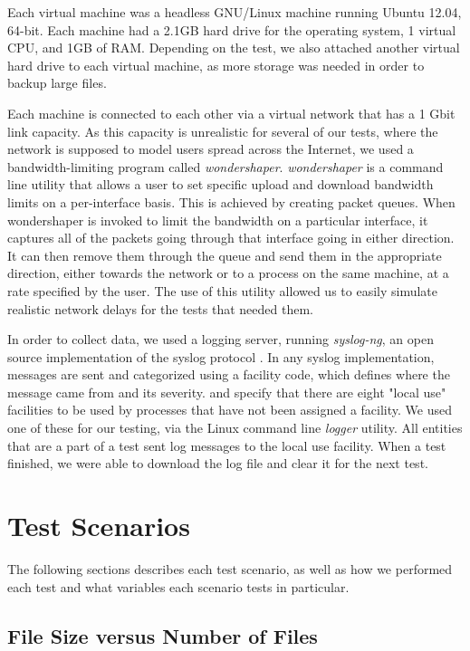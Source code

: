 \documentclass[12pt]{report}
\begin{document}
Each virtual machine was a headless GNU/Linux machine running Ubuntu 12.04, 64-bit. Each machine had a 2.1GB hard drive for the operating system, 1 virtual CPU, and 1GB of RAM. Depending on the test, we also attached another virtual hard drive to each virtual machine, as more storage was needed in order to backup large files.

Each machine is connected to each other via a virtual network that has a 1 Gbit link capacity. As this capacity is unrealistic for several of our tests, where the network is supposed to model users spread across the Internet, we used a bandwidth-limiting program called \textit{wondershaper}. \textit{wondershaper} is a command line utility that allows a user to set specific upload and download bandwidth limits on a per-interface basis. This is achieved by creating packet queues. When wondershaper is invoked to limit the bandwidth on a particular interface, it captures all of the packets going through that interface going in either direction. It can then remove them through the queue and send them in the appropriate direction, either towards the network or to a process on the same machine, at a rate specified by the user. The use of this utility allowed us to easily simulate realistic network delays for the tests that needed them.

In order to collect data, we used a logging server, running \textit{syslog-ng}, an open source implementation of the syslog protocol \cite{syslogRFC1,syslogRFC2}. In any syslog implementation, messages are sent and categorized using a facility code, which defines where the message came from and its severity. \cite{syslogRFC1} and \cite{syslogRFC2} specify that there are eight "local use" facilities to be used by processes that have not been assigned a facility. We used one of these for our testing, via the Linux command line \textit{logger} utility. All entities that are a part of a test sent log messages to the local use facility. When a test finished, we were able to download the log file and clear it for the next test.

\section{Test Scenarios} \label{sec:TestScenatios_chap:Methodology}

The following sections describes each test scenario, as well as how we performed each test and what variables each scenario tests in particular.

\subsection{File Size versus Number of Files} \label{subsec:FileSizeversusNumberofFiles_sec:TestScenarios_chap:Methodology}
\end{document}
